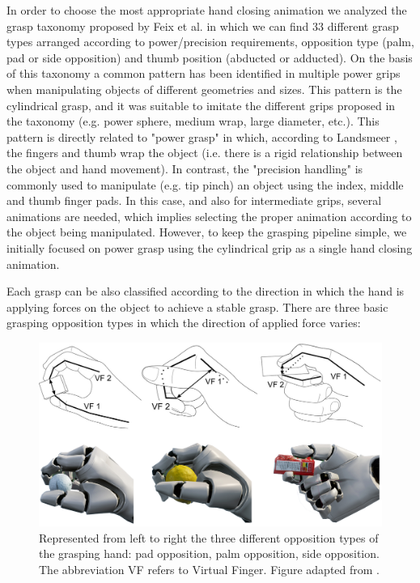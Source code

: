 In order to choose the most appropriate hand closing animation we analyzed the grasp taxonomy proposed by Feix et al. \cite{feix2016grasp} in which we can find 33 different grasp types arranged according to power/precision requirements, opposition type (palm, pad or side opposition) and thumb position (abducted or adducted). On the basis of this taxonomy a common pattern has been identified in multiple power grips when manipulating objects of different geometries and sizes. This pattern is the cylindrical grasp, and it was suitable to imitate the different grips proposed in the taxonomy (e.g. power sphere, medium wrap, large diameter, etc.). This pattern is directly related to "power grasp" in which, according to Landsmeer \cite{Landsmeer1962}, the fingers and thumb wrap the object (i.e. there is a rigid relationship between the object and hand movement). In contrast, the "precision handling" is commonly used to manipulate (e.g. tip pinch) an object using the index, middle and thumb finger pads. In this case, and also for intermediate grips, several animations are needed, which implies selecting the proper animation according to the object being manipulated. However, to keep the grasping pipeline simple, we initially focused on power grasp using the cylindrical grip as a single hand closing animation.

Each grasp can be also classified according to the direction in which the hand is applying forces on the object to achieve a stable grasp. There are three basic grasping opposition types in which the direction of applied force varies:

\begin{figure}[!t]
	\centering
	\includegraphics[width=0.95\linewidth]{figures/unrealgrasp/grasp_taxonomy.jpg}
	\caption{Represented from left to right the three different opposition types of the grasping hand: pad opposition, palm opposition, side opposition. The abbreviation VF refers to Virtual Finger. Figure adapted from \cite{feix2016grasp}.}
	\label{fig:grasp_taxonomy}
\end{figure}

